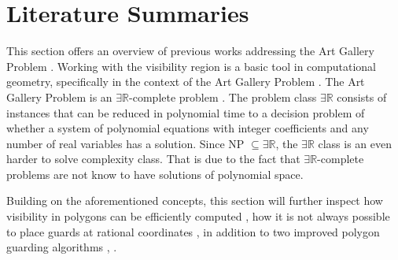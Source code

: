 \section{Literature Summaries}
\label{sec:literature}

This section offers an overview of previous works addressing the Art Gallery Problem \cite{o1987art}. 
Working with the visibility region is a basic tool in computational geometry, specifically in the context of the Art Gallery Problem \cite{o1987art}. The Art Gallery Problem \cite{o1987art} is an $\exists \mathbb R$-complete problem \cite{abrahamsen2021art}. The problem class $\exists \mathbb R$ consists of instances that can be reduced in polynomial time to a decision problem of whether a system of polynomial equations with integer coefficients and any number of real variables has a solution. Since NP $\subseteq \exists \mathbb R$, the $\exists \mathbb R$ class is an even harder to solve complexity class. That is due to the fact that $\exists \mathbb R$-complete problems are not know to have solutions of polynomial space. 

Building on the aforementioned concepts, this section will further inspect how visibility in polygons can be efficiently computed \cite{DBLP:journals/corr/BungiuHHHK14}, how it is not always possible to place guards at rational coordinates \cite{abrahamsen2021art}, in addition to two improved polygon guarding algorithms \cite{maleki2022implementation}, \cite{DBLP:journals/corr/abs-2007-06920}.





\newpage

